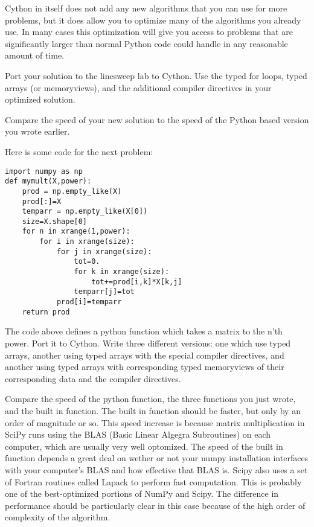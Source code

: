 Cython in itself does not add any new algorithms that you can use for more problems, but it does allow you to optimize many of the algorithms you already use.
In many cases this optimization will give you access to problems that are significantly larger than normal Python code could handle in any reasonable amount of time.

\begin{problem}
Port your solution to the linesweep lab to Cython.
Use the typed for loops, typed arrays (or memoryviews), and the additional compiler directives in your optimized solution.

Compare the speed of your new solution to the speed of the Python based version you wrote earlier.
\end{problem}

Here is some code for the next problem:
\begin{verbatim}
import numpy as np
def mymult(X,power):
    prod = np.empty_like(X)
    prod[:]=X
    temparr = np.empty_like(X[0])
    size=X.shape[0]
    for n in xrange(1,power):
        for i in xrange(size):
            for j in xrange(size):
                tot=0.
                for k in xrange(size):
                    tot+=prod[i,k]*X[k,j]
                temparr[j]=tot
            prod[i]=temparr
    return prod
\end{verbatim}

\begin{problem}
The code above defines a python function which takes a matrix to the n'th power.
Port it to Cython. Write three different versions: one which use typed arrays, another using typed arrays with the special compiler directives, and another using typed arrays with corresponding typed memoryviews of their corresponding data and the compiler directives.

Compare the speed of the python function, the three functions you just wrote, and the built in  function.
The built in function should be faster, but only by an order of magnitude or so.
This speed increase is because matrix multiplication in SciPy runs using the BLAS (Basic Linear Algegra Subroutines) on each computer, which are usually very well optomized.
The speed of the built in function depends a great deal on wether or not your numpy installation interfaces with your computer's BLAS and how effective that BLAS is.
Scipy also uses a set of Fortran routines called Lapack to perform fast computation.
This is probably one of the best-optimized portions of NumPy and Scipy.
The difference in performance should be particularly clear in this case because of the high order of complexity of the algorithm.
\end{problem}

